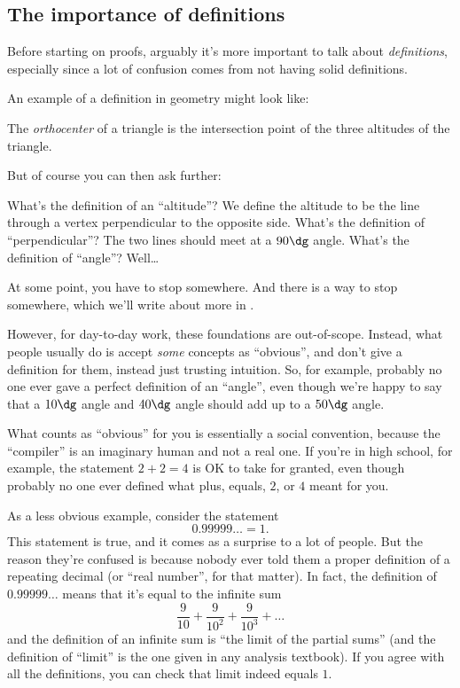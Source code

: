 \documentclass[11pt]{scrartcl}
\begin{document}
\subsection{The importance of definitions}
Before starting on proofs,
arguably it's more important to talk about \emph{definitions},
especially since a lot of confusion comes from not having solid definitions.

An example of a definition in geometry might look like:
\begin{definition}
  The \emph{orthocenter} of a triangle is the intersection
  point of the three altitudes of the triangle.
\end{definition}
But of course you can then ask further:
\begin{itemize}
  \ii What's the definition of an ``altitude''?
  We define the altitude to be the line
  through a vertex perpendicular to the opposite side.
  \ii What's the definition of ``perpendicular''?
  The two lines should meet at a $90\dg$ angle.
  \ii What's the definition of ``angle''? Well\dots
\end{itemize}
At some point, you have to stop somewhere.
And there is a way to stop somewhere,
which we'll write about more in .

However, \alert{for day-to-day work, these foundations are out-of-scope}.
Instead, what people usually do is accept \emph{some} concepts as ``obvious'',
and don't give a definition for them, instead just trusting intuition.
So, for example, probably no one ever gave a perfect definition of an ``angle'',
even though we're happy to say that a $10\dg$ angle and $40\dg$ angle
should add up to a $50\dg$ angle.

What counts as ``obvious'' for you is essentially a social convention,
because the ``compiler'' is an imaginary human and not a real one.
If you're in high school, for example, the statement $2+2=4$
is OK to take for granted, even though probably no one ever defined what
plus, equals, $2$, or $4$ meant for you.

As a less obvious example, consider the statement
\[ 0.99999\ldots = 1. \]
This statement is true, and it comes as a surprise to a lot of people.
But the reason they're confused is because nobody ever told them a
proper definition of a repeating decimal (or ``real number'', for that matter).
In fact, the definition of $0.99999\dots$ means
that it's equal to the infinite sum
\[ \frac{9}{10} + \frac{9}{10^2} + \frac{9}{10^3} + \dots \]
and the definition of an infinite sum is ``the limit of the partial sums''
(and the definition of ``limit'' is the one given in any analysis textbook).
If you agree with all the definitions, you can check that limit indeed equals $1$.
\end{document}
